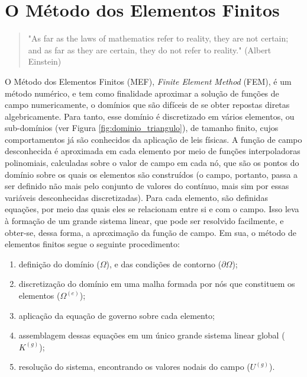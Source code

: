 \chapter{O Método dos Elementos Finitos}

\begin{quote}
    "As far as the laws of mathematics refer to reality, they are not certain; and as far as they are certain, they do not refer to reality." (Albert Einstein)
\end{quote}

O Método dos Elementos Finitos (MEF), \emph{Finite Element Method} (FEM), é um método numérico, e tem como finalidade aproximar a solução de funções de campo numericamente, o domínios que são difíceis de se obter repostas diretas algebricamente. Para tanto, esse domínio é discretizado em vários elementos, ou sub-domínios (ver Figura \ref{fig:dominio_triangulo}), de tamanho finito, cujos comportamentos já são conhecidos da aplicação de leis físicas. A função de campo desconhecida é aproximada em cada elemento por meio de funções interpoladoras polinomiais, calculadas sobre o valor de campo em cada nó, que são os pontos do domínio sobre os quais os elementos são construídos (o campo, portanto, passa a ser definido não mais pelo conjunto de valores do contínuo, mais sim por essas variáveis desconhecidas discretizadas). Para cada elemento, são definidas equações, por meio das quais eles se relacionam entre si e com o campo. Isso leva à formação de um grande sistema linear, que pode ser resolvido facilmente, e obter-se, dessa forma, a aproximação da função de campo. \cite{Onate} Em sua, o método de elementos finitos segue o seguinte procedimento:

\begin{enumerate}
    \item definição do domínio ($\Omega$), e das condições de contorno ($\partial\Omega$);
    \item discretização do domínio em uma malha formada por nós que constituem os elementos ($\Omega^{(e)}$);
    \item aplicação da equação de governo sobre cada elemento;
    \item assemblagem dessas equações em um único grande sistema linear global ($K^{(g)}$);
    \item resolução do sistema, encontrando os valores nodais do campo ($U^{(g)}$).
\end{enumerate}

